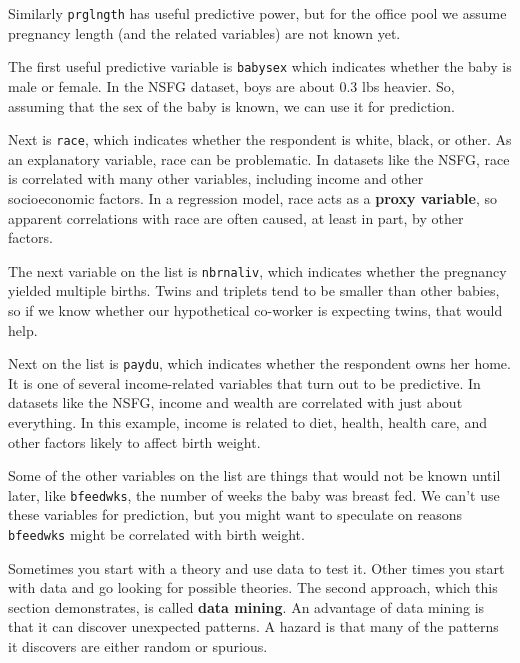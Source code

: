 \documentclass[12pt]{book}
\theoremstyle{exercise}
\begin{document}
Similarly {\tt prglngth} has useful predictive power, but for the
office pool we assume pregnancy length (and the related variables)
are not known yet.%
%

The first useful predictive variable is {\tt babysex} which indicates
whether the baby is male or female.  In the NSFG dataset, boys are
about 0.3 lbs heavier.  So, assuming that the sex of the baby is
known, we can use it for prediction.%

Next is {\tt race}, which indicates whether the respondent is white,
black, or other.  As an explanatory variable, race can be problematic.
In datasets like the NSFG, race is correlated with many other
variables, including income and other socioeconomic factors.  In a
regression model, race acts as a {\bf proxy variable},
so apparent correlations with race are often caused, at least in
part, by other factors.%
%

The next variable on the list is {\tt nbrnaliv}, which indicates
whether the pregnancy yielded multiple births.  Twins and triplets
tend to be smaller than other babies, so if we know whether our
hypothetical co-worker is expecting twins, that would help.%

Next on the list is {\tt paydu}, which indicates whether the
respondent owns her home.  It is one of several income-related
variables that turn out to be predictive.  In datasets like the NSFG,
income and wealth are correlated with just about everything.  In this
example, income is related to diet, health, health care, and other
factors likely to affect birth weight.%
%
%
%

Some of the other variables on the list are things that would not
be known until later, like {\tt bfeedwks}, the number of weeks
the baby was breast fed.  We can't use these variables for prediction,
but you might want to speculate on reasons
{\tt bfeedwks} might be correlated with birth weight.

Sometimes you start with a theory and use data to test it.  Other
times you start with data and go looking for possible theories.
The second approach, which this section demonstrates, is
called {\bf data mining}.  An advantage of data mining is that it
can discover unexpected patterns.  A hazard is that many of the
patterns it discovers are either random or spurious.%
%
\end{document}

